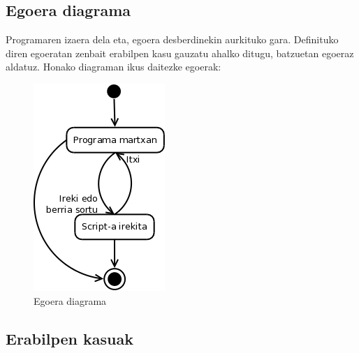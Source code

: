\subsection{Egoera diagrama}
Programaren izaera dela eta, egoera desberdinekin aurkituko gara. Definituko diren egoeratan zenbait erabilpen kasu gauzatu ahalko ditugu, batzuetan egoeraz aldatuz. Honako diagraman ikus daitezke egoerak:

\begin{figure}[htp]
\begin{center}
\includegraphics[scale=0.4]{Pictures/Chapter4/Analisia/ED.png}
\caption{Egoera diagrama}
\label{ed}
\end{center}
\end{figure}
\newpage
\subsection{Erabilpen kasuak}
